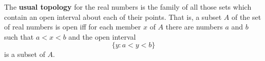 The \textbf{usual topology} for the real numbers is the family of all those sets which contain an open interval about each of their points. That is, a subset $A$ of the set of real numbers is open iff for each member $x$ of $A$ there are numbers $a$ and $b$ such that $a < x < b$ and the open interval 
$$\{y : a < y < b\}$$
is a subset of $A$.
